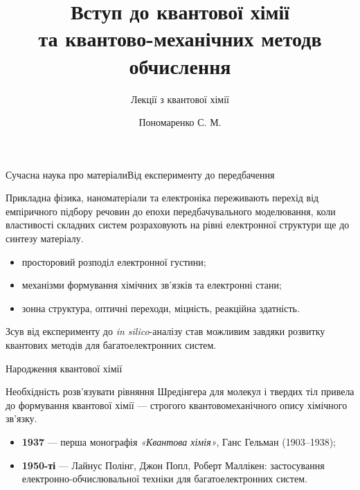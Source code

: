\documentclass[10pt]{beamer}
\title[Лекції з квантової хімії]{\huge\bfseries Вступ до квантової хімії\\ та квантово-механічних методв обчислення}
\subtitle{Лекції з квантової хімії}
\author{Пономаренко С. М.}
\date{}
\begin{document}
\begin{frame}
	\titlepage
\end{frame}

\begin{frame}{Сучасна наука про матеріали}{Від експерименту до передбачення}
\begin{block}{}\justifying
    Прикладна фізика, наноматеріали та електроніка переживають перехід від \alert{емпіричного підбору речовин} до епохи \alert{передбачувального моделювання}, коли властивості складних систем розраховують на рівні електронної структури ще до синтезу матеріалу.
\end{block}

\begin{itemize}\justifying
    \item просторовий розподіл електронної густини;
    \item механізми формування хімічних зв'язків та електронні стани;
    \item зонна структура, оптичні переходи, міцність, реакційна здатність.
\end{itemize}

\begin{alertblock}{}\centering
    Зсув від експерименту до \emph{in silico}-аналізу став можливим завдяки розвитку квантових методів для багатоелектронних систем.
\end{alertblock}
\end{frame}

\begin{frame}{Народження квантової хімії}{}
\begin{block}{}\justifying
    Необхідність розв'язувати рівняння Шредінгера для молекул і твердих тіл привела до формування \alert{квантової хімії} --- строгого квантовомеханічного опису хімічного зв'язку.
\end{block}

\begin{itemize}
    \item \textbf{1937} --- перша монографія \emph{«Квантова хімія»}, Ганс Гельман (1903--1938);
    \item \textbf{1950-ті} --- Лайнус Полінг, Джон Попл, Роберт Маллікен: застосування електронно-обчислювальної техніки для багатоелектронних систем.
\end{itemize}
\end{frame}
\end{document}
